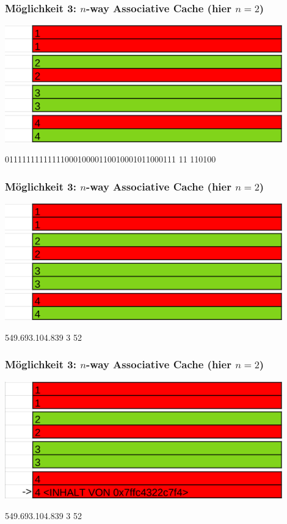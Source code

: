 \documentclass{beamer}
\begin{document}
\begin{frame}
\frametitle{M\"oglichkeit 3: $n$-way Associative Cache (hier $n=2$)}
\centerline{\includegraphics[width=12cm]{nac1.png}}
{\color{brown}0111111111111100010000110010001011000111} {\color{blue}11} {\color{orange}110100}
\end{frame}

\begin{frame}
\frametitle{M\"oglichkeit 3: $n$-way Associative Cache (hier $n=2$)}
\centerline{\includegraphics[width=12cm]{nac1.png}}
{\color{brown}549.693.104.839} {\color{blue}3} {\color{orange}52}
\end{frame}

\begin{frame}
\frametitle{M\"oglichkeit 3: $n$-way Associative Cache (hier $n=2$)}
\centerline{\includegraphics[width=12cm]{nac2.png}}
{\color{brown}549.693.104.839} {\color{blue}3} {\color{orange}52}
\end{frame}
\end{document}
